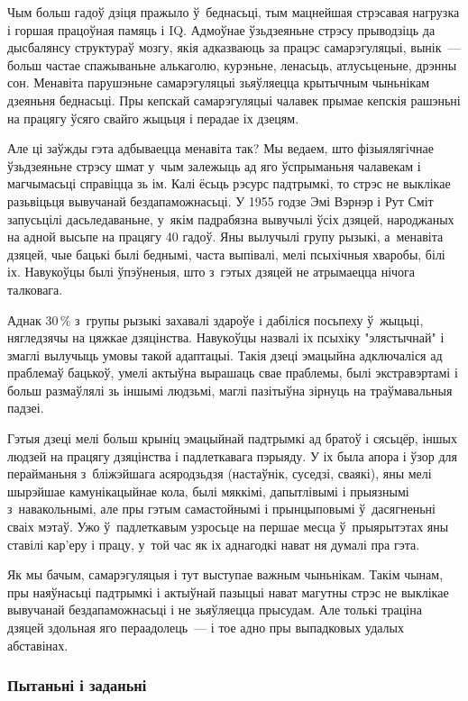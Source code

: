 Чым больш гадоў дзіця пражыло ў~беднасьці, тым мацнейшая стрэсавая нагрузка і горшая працоўная памяць і IQ. Адмоўнае ўзьдзеяньне стрэсу прыводзіць да дысбалянсу структураў мозгу, якія адказваюць за працэс самарэгуляцыі, вынік~--- больш частае спажываньне алькаголю, курэньне, ленасьць, атлусьценьне, дрэнны сон. Менавіта парушэньне самарэгуляцыі зьяўляецца крытычным чыньнікам дзеяньня беднасьці. Пры кепскай самарэгуляцыі чалавек прымае кепскія рашэньні на працягу ўсяго свайго жыцьця і перадае іх дзецям.

Але ці заўжды гэта адбываецца менавіта так? Мы ведаем, што фізыялягічнае ўзьдзеяньне стрэсу шмат у~чым залежыць ад яго ўспрыманьня чалавекам і магчымасьці справіцца зь ім. Калі ёсьць рэсурс падтрымкі, то стрэс не выклікае разьвіцьця вывучанай бездапаможнасьці. У 1955 годзе Эмі Вэрнэр і Рут Сміт запусьцілі дасьледаваньне, у~якім падрабязна вывучылі ўсіх дзяцей, народжаных на адной высьпе на працягу 40 гадоў. Яны вылучылі групу рызыкі, а~менавіта дзяцей, чые бацькі былі беднымі, часта выпівалі, мелі псыхічныя хваробы, білі іх. Навукоўцы былі ўпэўненыя, што з~гэтых дзяцей не атрымаецца нічога талковага.

Аднак 30\,\% з~групы рызыкі захавалі здароўе і дабіліся посьпеху ў~жыцьці, нягледзячы на цяжкае дзяцінства. Навукоўцы назвалі іх псыхіку "элястычнай" і змаглі вылучыць умовы такой адаптацыі. Такія дзеці эмацыйна адключаліся ад праблемаў бацькоў, умелі актыўна вырашаць свае праблемы, былі экстравэртамі і больш размаўлялі зь іншымі людзьмі, маглі пазітыўна зірнуць на траўмавальныя падзеі.

Гэтыя дзеці мелі больш крыніц эмацыйнай падтрымкі ад братоў і сясьцёр, іншых людзей на працягу дзяцінства і падлеткавага пэрыяду. У іх была апора і ўзор для перайманьня з~бліжэйшага асяродзьдзя (настаўнік, суседзі, сваякі), яны мелі шырэйшае камунікацыйнае кола, былі мяккімі, дапытлівымі і прыязнымі з~навакольнымі, але пры гэтым самастойнымі і прынцыповымі ў~дасягненьні сваіх мэтаў. Ужо ў~падлеткавым узросьце на першае месца ў~прыярытэтах яны ставілі кар'еру і працу, у~той час як іх аднагодкі нават ня думалі пра гэта.

Як мы бачым, самарэгуляцыя і тут выступае важным чыньнікам. Такім чынам, пры наяўнасьці падтрымкі і актыўнай пазыцыі нават магутны стрэс не выклікае вывучанай бездапаможнасьці і не зьяўляецца прысудам. Але толькі траціна дзяцей здольная яго пераадолець~--- і тое адно пры выпадковых удалых абставінах.

\subsubsection{Пытаньні і заданьні}

